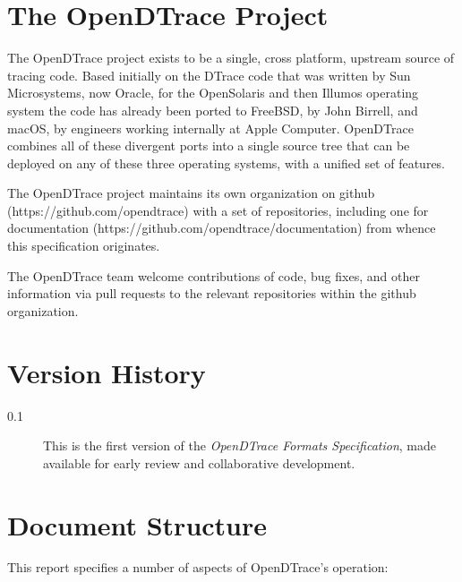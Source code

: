 
\section{The OpenDTrace Project}
\label{sec:opendtrace-project}

The OpenDTrace project exists to be a single, cross platform, upstream
source of tracing code.  Based initially on the DTrace code that was
written by Sun Microsystems, now Oracle, for the OpenSolaris and then
Illumos operating system the code has already been ported to FreeBSD,
by John Birrell, and macOS, by engineers working internally at Apple
Computer.  OpenDTrace combines all of these divergent ports into a
single source tree that can be deployed on any of these three
operating systems, with a unified set of features.  

The OpenDTrace project maintains its own organization on github
(https://github.com/opendtrace) with a set of repositories, including
one for documentation (https://github.com/opendtrace/documentation)
from whence this specification originates.

The OpenDTrace team welcome contributions of code, bug fixes, and
other information via pull requests to the relevant repositories
within the github organization.

\section{Version History}

\begin{description}
\item[0.1] This is the first version of the \textit{OpenDTrace Formats
  Specification}, made available for early review and collaborative
  development.
\end{description}

\section{Document Structure}

This report specifies a number of aspects of OpenDTrace's operation:

